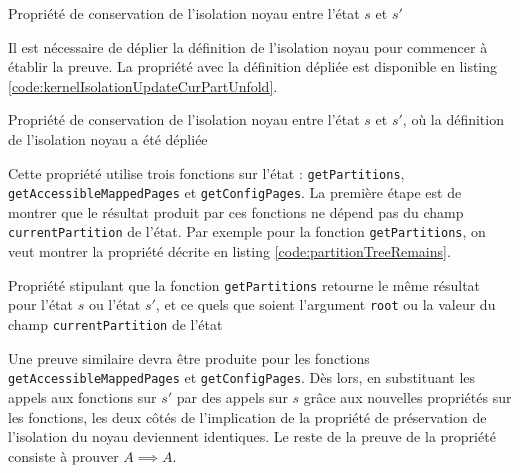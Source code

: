 			\begin{listing}[!ht]
				\caption{Propriété de conservation de l'isolation noyau entre l'état $s$ et $s'$}
				\label{code:kernelIsolationUpdateCurPart}
			\end{listing}
			\label{sec:curPartKernelIsolation}

			Il est nécessaire de déplier la définition de l'isolation noyau pour commencer à établir la preuve. La propriété avec la définition dépliée est disponible en listing \ref{code:kernelIsolationUpdateCurPartUnfold}.

			\begin{listing}[!ht]
				\caption{Propriété de conservation de l'isolation noyau entre l'état $s$ et $s'$, où la définition de l'isolation noyau a été dépliée}
				\label{code:kernelIsolationUpdateCurPartUnfold}
			\end{listing}

			Cette propriété utilise trois fonctions sur l'état : \texttt{getPartitions}, \texttt{getAccessibleMappedPages} et \texttt{getConfigPages}. La première étape est de montrer que le résultat produit par ces fonctions ne dépend pas du champ \texttt{currentPartition} de l'état. Par exemple pour la fonction \texttt{getPartitions}, on veut montrer la propriété décrite en listing \ref{code:partitionTreeRemains}.

			\begin{listing}[!ht]
				\caption{Propriété stipulant que la fonction \texttt{getPartitions} retourne le même résultat pour l'état $s$ ou l'état $s'$, et ce quels que soient l'argument \texttt{root} ou la valeur du champ \texttt{currentPartition} de l'état}
				\label{code:partitionTreeRemains}
			\end{listing}

			Une preuve similaire devra être produite pour les fonctions \texttt{getAccessibleMappedPages} et \texttt{getConfigPages}. Dès lors, en substituant les appels aux fonctions sur $s'$ par des appels sur $s$ grâce aux nouvelles propriétés sur les fonctions, les deux côtés de l'implication de la propriété de préservation de l'isolation du noyau deviennent identiques. Le reste de la preuve de la propriété consiste à prouver $A \implies A$.\\


